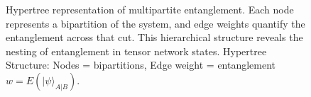 \begin{figure}[htbp]
	\centering
	\caption{Hypertree representation of multipartite entanglement. Each node represents a bipartition of the system, and edge weights quantify the entanglement across that cut. This hierarchical structure reveals the nesting of entanglement in tensor network states. Hypertree Structure: Nodes = bipartitions, Edge weight = entanglement $w = E(|\psi\rangle_{A|B})$.}
	\label{fig:hypertree}
\end{figure}
